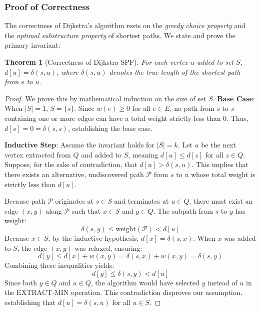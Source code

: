 \documentclass[12pt,a4paper,oneside]{report}
\newtheorem{theorem}{Theorem}[chapter]
\begin{document}
\subsubsection{Proof of Correctness}
The correctness of Dijkstra's algorithm rests on the \emph{greedy choice property} and the \emph{optimal substructure property} of shortest paths. We state and prove the primary invariant:

\begin{theorem}[Correctness of Dijkstra SPF]
For each vertex $u$ added to set $S$, $d[u] = \delta(s, u)$, where $\delta(s, u)$ denotes the true length of the shortest path from $s$ to $u$.
\end{theorem}

\begin{proof}
We prove this by mathematical induction on the size of set $S$.
\textbf{Base Case}: When $|S| = 1$, $S = \{s\}$. Since $w(e) \ge 0$ for all $e \in E$, no path from $s$ to $s$ containing one or more edges can have a total weight strictly less than $0$. Thus, $d[s] = 0 = \delta(s, s)$, establishing the base case.

\textbf{Inductive Step}: Assume the invariant holds for $|S| = k$. Let $u$ be the next vertex extracted from $Q$ and added to $S$, meaning $d[u] \le d[z]$ for all $z \in Q$. Suppose, for the sake of contradiction, that $d[u] > \delta(s, u)$. This implies that there exists an alternative, undiscovered path $\mathcal{P}$ from $s$ to $u$ whose total weight is strictly less than $d[u]$.

Because path $\mathcal{P}$ originates at $s \in S$ and terminates at $u \in Q$, there must exist an edge $(x, y)$ along $\mathcal{P}$ such that $x \in S$ and $y \in Q$. The subpath from $s$ to $y$ has weight:
\begin{equation}
    \delta(s, y) \le \text{weight}(\mathcal{P}) < d[u]
\end{equation}
Because $x \in S$, by the inductive hypothesis, $d[x] = \delta(s, x)$. When $x$ was added to $S$, the edge $(x, y)$ was relaxed, ensuring:
\begin{equation}
    d[y] \le d[x] + w(x, y) = \delta(s, x) + w(x, y) = \delta(s, y)
\end{equation}
Combining these inequalities yields:
\begin{equation}
    d[y] \le \delta(s, y) < d[u]
\end{equation}
Since both $y \in Q$ and $u \in Q$, the algorithm would have selected $y$ instead of $u$ in the $\text{EXTRACT-MIN}$ operation. This contradiction disproves our assumption, establishing that $d[u] = \delta(s, u)$ for all $u \in S$.
\end{proof}
\end{document}
